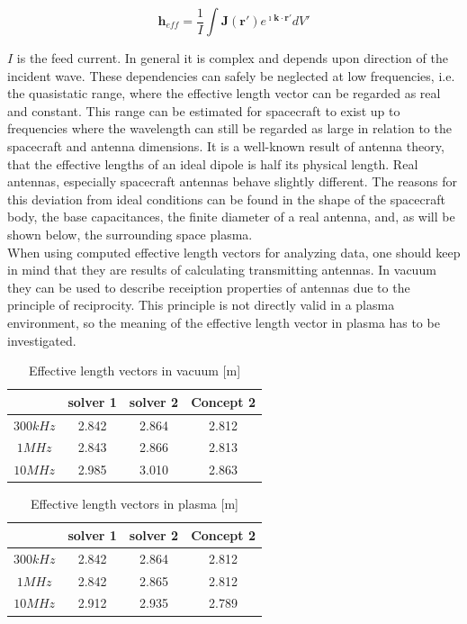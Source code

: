 \documentclass[two-column,ras]{agutex}
\begin{document}
\begin{article}
\begin{equation}
\textbf{h}_{eff}=\frac{1}{I}\int \mathbf{J}(\mathbf{r}')e^{\imath \mathbf{k} \cdot \mathbf{r}'} dV'
 \end{equation}

$I$ is the feed current. In general it is complex and depends upon direction of the incident wave. These dependencies can safely be neglected at low frequencies, i.e. the quasistatic range, where the effective length vector can be regarded as real and constant. This range can be estimated for spacecraft to exist up to frequencies where the wavelength can still be regarded as large in relation to the spacecraft and antenna dimensions. It is a well-known result of antenna theory, that the effective lengths of an ideal dipole is half its physical length. Real antennas, especially spacecraft antennas behave slightly different. The reasons for this deviation from ideal conditions can be found in the shape of the spacecraft body, the base capacitances, the finite diameter of a real antenna, and, as will be shown below, the surrounding space plasma.\\

When using computed effective length vectors for analyzing data, one should keep in mind that they are results of calculating transmitting antennas. In vacuum they can be used to describe receiption properties of antennas due to the principle of reciprocity. This principle is not directly valid in a plasma environment, so the meaning of the effective length vector in plasma has to be investigated.\\


\begin{table}
\caption{Effective length vectors in vacuum [m]}
\label{tab:heff_vacuum}
\begin{tabular}{|c|c|c|c|}
 \hline
 & solver 1  & solver 2  & Concept 2 \\
\hline
$300 kHz$ & 2.842 & 2.864 & 2.812 \\
$1 MHz$ & 2.843 & 2.866 &  2.813 \\
$10 MHz$ & 2.985 & 3.010 &  2.863  \\
\hline
\end{tabular}
\end{table}

\begin{table}
\caption{Effective length vectors in plasma [m]}
\label{tab:heff_plasma}
\begin{tabular}{|c|c|c|c|}
 \hline
 & solver 1  & solver 2  & Concept 2 \\
\hline
$300 kHz$ & 2.842 & 2.864 & 2.812  \\
$1 MHz$ & 2.842 & 2.865 & 2.812  \\
$10 MHz$ & 2.912 & 2.935 & 2.789 \\
\hline
\end{tabular}
\end{table}


\end{article}
\end{document}
